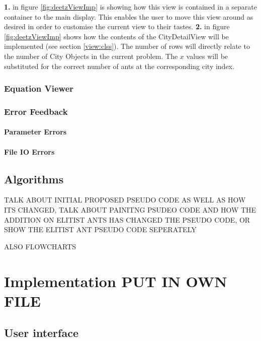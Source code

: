 \textbf{1.} in figure \ref{fig:deetzViewImp} is showing how this view is contained in a separate container to the main display. This enables the user to move this view around as desired in order to customise the current view to their tastes. \textbf{2.} in figure \ref{fig:deetzViewImp} shows how the contents of the CityDetailView will be implemented (see section \ref{view:clss}). The number of rows will directly relate to the number of City Objects in the current problem. The $x$ values will be substituted for the correct number of ants at the corresponding city index.







\subsection{Equation Viewer}
\label{eqnlview}

\subsection{Error Feedback}

\subsubsection{Parameter Errors}

\subsubsection{File IO Errors}

\section{Algorithms}

TALK ABOUT INITIAL PROPOSED PSEUDO CODE AS WELL AS HOW ITS CHANGED, TALK ABOUT PAINITNG PSUDEO CODE AND HOW THE ADDITION ON ELITIST ANTS HAS CHANGED THE PSEUDO CODE, OR SHOW THE ELITIST ANT PSEUDO CODE SEPERATELY 

ALSO FLOWCHARTS


\chapter{Implementation PUT IN OWN FILE}

\section{User interface}
